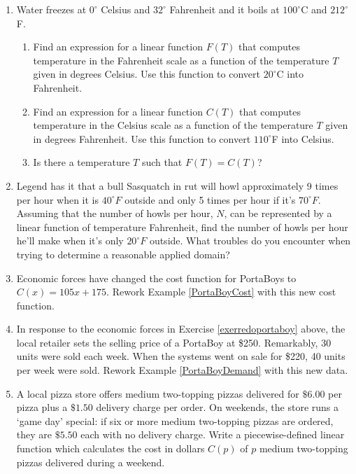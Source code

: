 \documentclass{ximera}
\begin{document}
\begin{enumerate}
\item Water freezes at $0^{\circ}$ Celsius and $32^{\circ}$ Fahrenheit and it boils at $100^{\circ}$C and $212^{\circ}$F.
\label{celsiustofahr}

\begin{enumerate}

\item Find an expression for a  linear function $F(T)$ that computes temperature in the Fahrenheit scale as a function of  the temperature $T$ given in degrees Celsius.  Use this function to convert $20^{\circ}$C into Fahrenheit.

\item Find an expression for a  linear function $C(T)$ that computes temperature in the Celsius scale as a function of  the temperature $T$ given in degrees Fahrenheit.  Use this function to convert $110^{\circ}$F into Celsius.

\item Is there a temperature $T$ such that $F(T) = C(T)$?

\end{enumerate}

\enlargethispage{0.5in}

\item Legend has it that a bull Sasquatch in rut will howl approximately 9 times per hour when it is $40^{\circ}F$ outside and only 5 times per hour if it's $70^{\circ}F$.  Assuming that the number of howls per hour, $N$, can be represented by a linear function of temperature Fahrenheit, find the number of howls per hour he'll make when it's only $20^{\circ}F$ outside. What troubles do you encounter when trying to determine a reasonable applied domain?

\item \label{exerredoportaboy} Economic forces have changed the cost function for PortaBoys to $C(x) = 105x + 175$.  Rework Example \ref{PortaBoyCost} with this new cost function.

\item In response to the economic forces in Exercise \ref{exerredoportaboy} above, the local retailer sets the selling price of a PortaBoy at \$250.  Remarkably, 30 units were sold each week.  When the systems went on sale for \$220, 40 units per week were sold.  Rework Example \ref{PortaBoyDemand}  with this new data.

\item A local pizza store offers medium two-topping pizzas delivered for $\$6.00$ per pizza plus a $\$1.50$ delivery charge per order.  On weekends, the store runs a `game day' special:  if six or more medium two-topping pizzas are ordered, they are $\$5.50$ each with no delivery charge.  Write a piecewise-defined linear function which calculates the cost in dollars $C(p)$ of  $p$ medium two-topping pizzas delivered during a weekend.


\end{enumerate}
\end{document}
